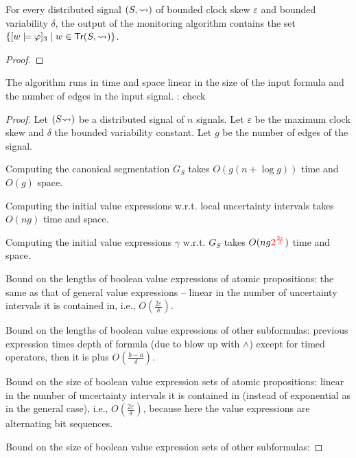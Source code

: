 \begin{claim}
	For every distributed signal $(S, {\rightsquigarrow})$ of bounded clock skew $\varepsilon$ and bounded variability $\delta$, the output of the monitoring algorithm contains the set $\{ [w \models \varphi]_3 \st w \in \tr(S, {\hb}) \}$.
\end{claim}
\begin{proof}
	\TODO
\end{proof}

\begin{claim}
	The algorithm runs in time and space linear in the size of the input formula and the number of edges in the input signal. \TODO: check
\end{claim}
\begin{proof}
	\TODO %
	
	Let $(S {\rightsquigarrow})$ be a distributed signal of $n$ signals.
	Let $\varepsilon$ be the maximum clock skew and $\delta$ the bounded variability constant.
	Let $g$ be the number of edges of the signal.
	
	Computing the canonical segmentation $G_S$ takes $O(g (n + \log g))$ time and $O(g)$ space.
	
	Computing the initial value expressions w.r.t. local uncertainty intervals takes $O(n g)$ time and space.
	
	Computing the initial value expressions $\gamma$ w.r.t. $G_S$ takes $O(n g \textcolor{red}{2^{\frac{2\varepsilon}{\delta}}})$ time and space. 
	
	Bound on the lengths of boolean value expressions of atomic propositions: the same as that of general value expressions -- linear in the number of uncertainty intervals it is contained in, i.e., \alert{$O(\frac{2\varepsilon}{\delta})$}.
	
	Bound on the lengths of boolean value expressions of other subformulas: previous expression times depth of formula (due to blow up with $\land$) except for timed operators, then it is plus $O(\frac{b-a}{\delta})$.
	
	Bound on the size of boolean value expression sets of atomic propositions: linear in the number of uncertainty intervals it is contained in (instead of exponential as in the general case), i.e., \alert{$O(\frac{2\varepsilon}{\delta})$}, because here the value expressions are alternating bit sequences.
	
	Bound on the size of boolean value expression sets of other subformulas: 
	
	
\end{proof}